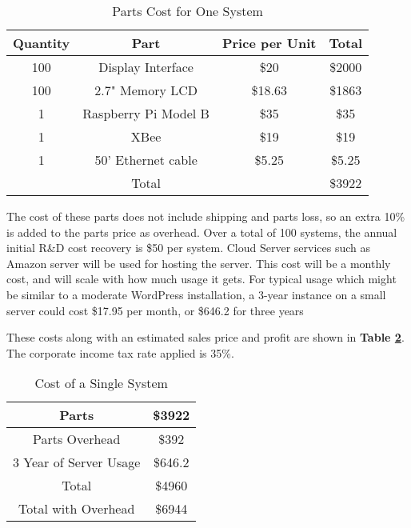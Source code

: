 \documentclass[PPFS.tex]{template/subfiles}
\begin{document}
        \begin{table}[H]
        	\begin{center}
        		\caption{Parts Cost for One System}
        		\label{tab:prodPartsCost}
        		\begin{tabular}{|c|c|c|c|}
        			\hline
        			Quantity & Part & Price per Unit & Total\\
        			\hline
        			100 & Display Interface & \$20 & \$2000\\
        			\hline
        			100 & 2.7" Memory LCD & \$18.63 \cite{mouserMemoryLCD} & \$1863\\
        			\hline
        			1 & Raspberry Pi Model B & \$35 \cite{alliedRaspberryPi} & \$35\\
        			\hline
        			1 & XBee & \$19 \cite{mouserXBEE} & \$19\\
        			\hline
        			1 & 50' Ethernet cable & \$5.25 \cite{amazonEthernetCable} & \$5.25\\
        			\hline
        			&Total&& \$3922\\
        			\hline
        		\end{tabular}
        	\end{center}
        \end{table}
        
        The cost of these parts does not include shipping and parts loss, so an extra 10\% is added to the parts price as overhead. 
        Over a total of 100 systems, the annual initial R\&D cost recovery is \$50 per system.
        Cloud Server services such as Amazon server will be used for hosting the server. This cost will be a monthly cost, and will scale with how much usage it gets. For typical usage which might be similar to a moderate WordPress installation, a 3-year instance on a small server could cost \$17.95 per month, or \$646.2 for three years \cite{wordPressEstimate}
        
        These costs along with an estimated sales price and profit are shown in \textbf{Table \ref{tab:prodTotalCosts}}. The corporate income tax rate applied is 35\%.
        
        \begin{table}[H]
        	\begin{center}
        		\caption{Cost of a Single System}
        		\label{tab:prodTotalCosts}
        		\begin{tabular}{|c|c|}
        			\hline
        			Parts & \$3922\\
        			\hline
        			Parts Overhead & \$392\\
        			\hline
        			3 Year of Server Usage & \$646.2\\
        			\hline
        			Total & \$4960\\
        			\hline
        			Total with Overhead & \$6944\\
        			\hline
        		\end{tabular}
        	\end{center}
        \end{table}
        
\end{document}
